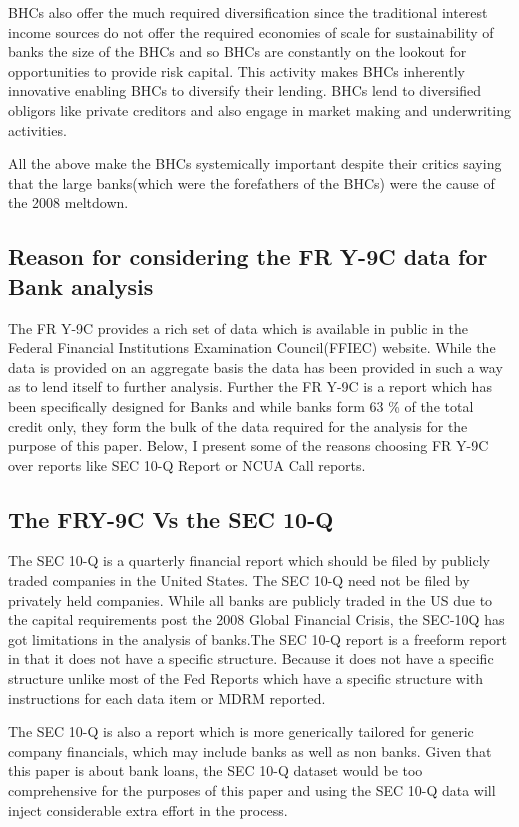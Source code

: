 \documentclass[conference]{IEEEtran}
\begin{document}
     BHCs also offer the much required diversification since the traditional interest income sources do not offer the required economies of scale for sustainability of banks the size of the BHCs and so BHCs are constantly on the lookout for opportunities to provide risk capital. This activity makes BHCs inherently innovative enabling BHCs to diversify their lending. BHCs lend to diversified obligors like private creditors and also engage in market making and underwriting activities.
     
     All the above make the BHCs systemically important despite their critics saying that the large banks(which were the forefathers of the BHCs) were the cause of the 2008 meltdown.
     
\subsection{Reason for considering the FR Y-9C data for Bank analysis}
       The FR Y-9C provides a rich set of data which is available in public in the Federal Financial Institutions Examination Council(FFIEC) website. While the data is provided on an aggregate basis the data has been provided in such a way as to lend itself to further analysis. Further the FR Y-9C is a report which has been specifically designed for Banks and while banks form 63 \% of the total credit only, they form the bulk of the data required for the analysis for the purpose of this paper. Below, I present some of the reasons choosing FR Y-9C over reports like SEC 10-Q Report or NCUA Call reports.
\subsection{The FRY-9C Vs the SEC 10-Q}

The SEC 10-Q is a quarterly financial report which should be filed by publicly traded companies in the United States.\cite{SEC10Q} The SEC 10-Q need not be filed by privately held companies. While all banks are publicly traded in the US due to the capital requirements post the 2008 Global Financial Crisis, the SEC-10Q has got limitations in the analysis of banks.The SEC 10-Q report is a freeform report in that it does not have a specific structure. Because it does not have a specific structure unlike most of the Fed Reports which have a specific structure with instructions for each data item or MDRM reported.\cite{MDRM}

The SEC 10-Q is also a report which is more generically tailored for generic company financials, which may include banks as well as non banks. Given that this paper is about bank loans, the SEC 10-Q dataset would be too comprehensive for the purposes of this paper and using the SEC 10-Q data will inject considerable extra effort in the process. 
\end{document}
